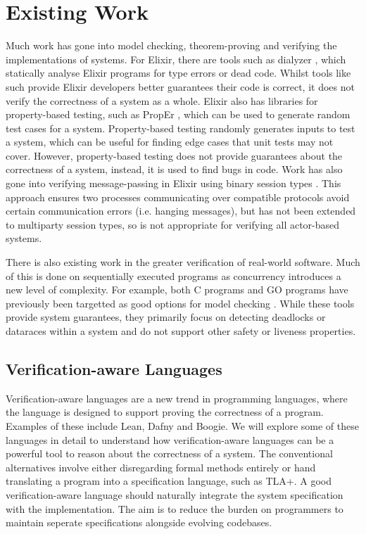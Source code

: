 \section{Existing Work} \label{sec:existing_work}
Much work has gone into model checking, theorem-proving and verifying the implementations of systems. For Elixir, there are tools such as dialyzer \cite{dialyzer}, which statically analyse Elixir programs for type errors or dead code. Whilst tools like such provide Elixir developers better guarantees their code is correct, it does not verify the correctness of a system as a whole. Elixir also has libraries for property-based testing, such as PropEr \cite{proper}, which can be used to generate random test cases for a system. Property-based testing randomly generates inputs to test a system, which can be useful for finding edge cases that unit tests may not cover. However, property-based testing does not provide guarantees about the correctness of a system, instead, it is used to find bugs in code. Work has also gone into verifying message-passing in Elixir using binary session types \cite{binary_session_types}. This approach ensures two processes communicating over compatible protocols avoid certain communication errors (i.e. hanging messages), but has not been extended to multiparty session types, so is not appropriate for verifying all actor-based systems.
\par
There is also existing work in the greater verification of real-world software. Much of this is done on sequentially executed programs as concurrency introduces a new level of complexity. For example, both C programs and GO programs have previously been targetted as good options for model checking \cite{gomela, c_to_promela}. While these tools provide system guarantees, they primarily focus on detecting deadlocks or dataraces within a system and do not support other safety or liveness properties.  
\subsection{Verification-aware Languages}
Verification-aware languages are a new trend in programming languages, where the language is designed to support proving the correctness of a program. Examples of these include Lean, Dafny and Boogie. We will explore some of these languages in detail to understand how verification-aware languages can be a powerful tool to reason about the correctness of a system. The conventional alternatives involve either disregarding formal methods entirely or hand translating a program into a specification language, such as TLA+. A good verification-aware language should naturally integrate the system specification with the implementation. The aim is to reduce the burden on programmers to maintain seperate specifications alongside evolving codebases.
